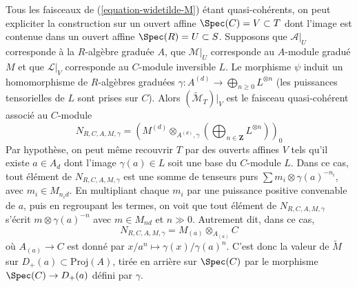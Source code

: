 \medskip\noindent
Tous les faisceaux de (\ref{equation-widetilde-M}) étant quasi-cohérents,
on peut expliciter la construction sur un ouvert affine
$\Spec(C) = V \subset T$ dont l'image est contenue dans un ouvert affine
$\Spec(R) = U \subset S$. Supposons que $\mathcal{A}|_U$ corresponde à la
$R$-algèbre graduée $A$, que $\mathcal{M}|_U$ corresponde au $A$-module
gradué $M$ et que $\mathcal{L}|_V$
corresponde au $C$-module inversible $L$.
Le morphisme $\psi$ induit un homomorphisme de $R$-algèbres graduées
$\gamma : A^{(d)} \to \bigoplus_{n \geq 0} L^{\otimes n}$
(les puissances tensorielles de $L$ sont prises sur $C$).
Alors $(\widetilde{\mathcal{M}}_T)|_V$ est le faisceau quasi-cohérent
associé au $C$-module
$$
N_{R, C, A, M, \gamma} =
\left(
M^{(d)} \otimes_{A^{(d)}, \gamma}
\left(\bigoplus\nolimits_{n \in \mathbf{Z}} L^{\otimes n}\right)
\right)_0
$$
Par hypothèse, on peut même recouvrir $T$ par des ouverts affines $V$ tels
qu'il existe $a \in A_d$ dont l'image $\gamma(a) \in L$ soit une base du
$C$-module $L$. Dans ce cas, tout élément de $N_{R, C, A, M, \gamma}$ est
une somme de tenseurs purs $\sum m_i \otimes \gamma(a)^{-n_i}$, avec
$m_i \in M_{n_id}$. En multipliant
chaque $m_i$ par une puissance positive
convenable de $a$, puis en regroupant
les termes, on voit que tout élément
de $N_{R, C, A, M, \gamma}$ s'écrit $m \otimes \gamma(a)^{-n}$ avec
$m \in M_{nd}$ et $n \gg 0$. Autrement dit, dans ce cas,
$$
N_{R, C, A, M, \gamma} = M_{(a)} \otimes_{A_{(a)}} C
$$
où $A_{(a)} \to C$ est donné par
$x/a^n \mapsto \gamma(x)/\gamma(a)^n$.
C'est donc la valeur de $\widetilde{M}$ sur
$D_{+}(a) \subset \text{Proj}(A)$, tirée en arrière sur $\Spec(C)$ par le
morphisme $\Spec(C) \to D_{+}(a)$ défini par $\gamma$.


